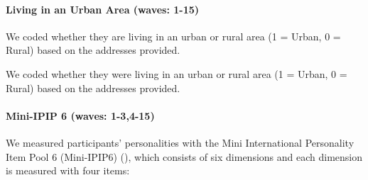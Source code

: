 \documentclass[
  singlecolumn]{article}
\let\oldparagraph\paragraph
\renewcommand{\paragraph}[1]{\oldparagraph{#1}\mbox{}}
\begin{document}
\paragraph{Living in an Urban Area (waves:
1-15)}\label{living-in-an-urban-area-waves-1-15}

We coded whether they are living in an urban or rural area (1 = Urban, 0
= Rural) based on the addresses provided.

We coded whether they were living in an urban or rural area (1 = Urban,
0 = Rural) based on the addresses provided.

\paragraph{Mini-IPIP 6 (waves:
1-3,4-15)}\label{mini-ipip-6-waves-1-34-15}

We measured participants' personalities with the Mini International
Personality Item Pool 6 (Mini-IPIP6) (), which consists of six dimensions and each
dimension is measured with four items:
\end{document}
